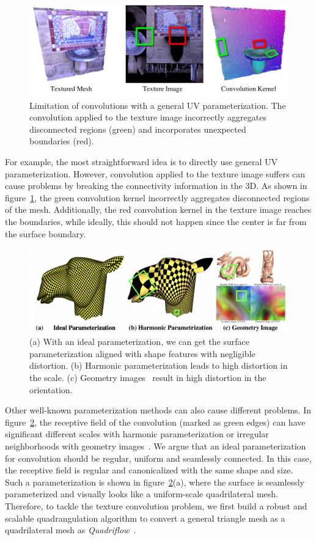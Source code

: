  \begin{figure}
  \centering
  \includegraphics[width=0.8\linewidth]{intro/uvconv.png}
  \caption{Limitation of convolutions with a general UV parameterization. The convolution applied to the texture image incorrectly aggregates disconnected regions (green) and incorporates unexpected boundaries (red).}
  \label{fig:intro-uv-param}
\end{figure}
For example, the most straightforward idea is to directly use general UV parameterization. However, convolution applied to the texture image suffers can cause problems by breaking the connectivity information in the 3D. As shown in figure~\ref{fig:intro-uv-param}, the green convolution kernel incorrectly aggregates disconnected regions of the mesh. Additionally, the red convolution kernel in the texture image reaches the boundaries, while ideally, this should not happen since the center is far from the surface boundary.
 \begin{figure}
    \centering
     \includegraphics[width=0.8\linewidth]{quadriflow/param.png}
     \caption{(a) With an ideal parameterization, we can get the surface parameterization aligned with shape features with negligible distortion. (b) Harmonic parameterization leads to high distortion in the scale. (c) Geometry images~\cite{gu2002geometry} result in high distortion in the orientation.}
     \label{fig:intro-quadriflow-param}
 \end{figure}
Other well-known parameterization methods can also cause different problems. In figure~\ref{fig:intro-quadriflow-param}, the receptive field of the convolution (marked as green edges) can have significant different scales with harmonic parameterization or irregular neighborhoods with geometry images~\cite{gu2002geometry}. We argue that an ideal parameterization for convolution should be regular, uniform and seamlessly connected. In this case, the receptive field is regular and canonicalized with the same shape and size. Such a parameterization is shown in figure~\ref{fig:intro-quadriflow-param}(a), where the surface is seamlessly parameterized and visually looks like a uniform-scale quadrilateral mesh. Therefore, to tackle the texture convolution problem, we first build a robust and scalable quadrangulation algorithm to convert a general triangle mesh as a quadrilateral mesh as \textit{Quadriflow}~\cite{huang2018quadriflow}.

